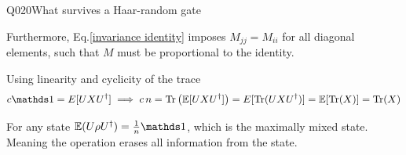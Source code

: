 \begin{entry}{Q020}{What survives a Haar-random gate}
\begin{solution}[Part (c)]
Furthermore, Eq.\eqref{invariance identity} imposes $M_{jj}=M_{ii}$ for all diagonal elements, such that $M$ must be proportional to the identity.

\end{solution}

\begin{solution}[Part (d)]
Using linearity and cyclicity of the trace 
\begin{equation}
    c \id= E[UXU^{\dagger}]   \implies c\, n= \Tr\left( \mathbb E[UXU^{\dagger}]\right) = E[\Tr(UXU^{\dagger})] = \mathbb E[ \Tr(X)]= \Tr(X)
\end{equation}
\end{solution}

\begin{solution}[Part (e)]
For any state $\mathbb E(U\rho U^\dagger)= \frac{1}{n} \id$, which is the maximally mixed state. Meaning the operation erases all information from the state. 
\end{solution}




\end{entry}